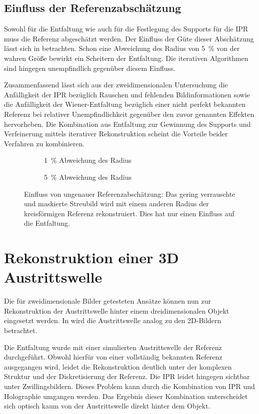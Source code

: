 \subsection{Einfluss der Referenzabschätzung}
Sowohl für die Entfaltung wie auch für die Festlegung des Supports für die IPR muss die Referenz abgeschätzt werden. Der Einfluss der Güte dieser Abschätzung lässt sich in  betrachten. Schon eine Abweichung des Radius von 5~\% von der wahren Größe bewirkt ein Scheitern der Entfaltung. Die iterativen Algorithmen sind hingegen unempfindlich gegenüber diesem Einfluss.

Zusammenfassend lässt sich aus der zweidimensionalen Untersuchung die Anfälligkeit der IPR bezüglich Rauschen und fehlenden Bildinformationen sowie die Anfälligkeit der Wiener-Entfaltung bezüglich einer nicht perfekt bekannten Referenz bei relativer Unempfindlichkeit gegenüber den zuvor genannten Effekten hervorheben. Die Kombination aus Entfaltung zur Gewinnung des Supports und Verfeinerung mittels iterativer Rekonstruktion scheint die Vorteile beider Verfahren zu kombinieren.
\begin{figure}
	\begin{subfigure}[b]{0.45\textwidth}
		\caption{1~\% Abweichung des Radius}
	\end{subfigure}
	\hspace*{\fill}
	\begin{subfigure}[b]{0.45\textwidth}
		\caption{5~\% Abweichung des Radius}	
	\end{subfigure}
	\caption[2D Rekonstruktion: Referenz]{Einfluss von ungenauer Referenzabschätzung: Das gering verrauschte und maskierte Streubild wird mit einem anderen Radius der kreisförmigen Referenz rekonstruiert. Dies hat nur einen Einfluss auf die Entfaltung.}
	\label{fig:recon2d-ref}
\end{figure}
 \clearpage
\section{Rekonstruktion einer 3D Austrittswelle}
Die für zweidimensionale Bilder getesteten Ansätze können nun zur Rekonstruktion der Austrittswelle hinter einem dreidimensionalen Objekt eingesetzt werden. In  wird die Austrittswelle analog zu den 2D-Bildern betrachtet.
	
Die Entfaltung wurde mit einer simulierten Austrittswelle der Referenz durchgeführt. Obwohl hierfür von einer vollständig bekannten Referenz ausgegangen wird, leidet die Rekonstruktion deutlich unter der komplexen Struktur und der Diskretisierung der Referenz. Die IPR leidet hingegen sichtbar unter Zwillingsbildern. Dieses Problem kann durch die Kombination von IPR und Holographie umgangen werden. Das Ergebnis dieser Kombination unterscheidet sich optisch kaum von der Austrittswelle direkt hinter dem Objekt.

